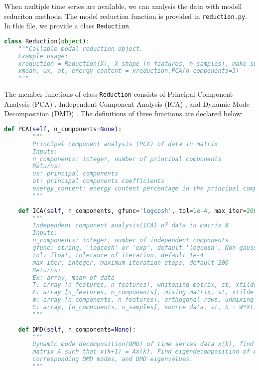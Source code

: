 
When multiple time series are available, we can analysis the data with modell reduciton methods. The model reduction function is provided in \texttt{reduction.py}. In this file, we provide a class \texttt{Reduction}.

\begin{lstlisting}[language=Python]
class Reduction(object):
    """Callable modal reduction object.
    Example usage:
    xreduction = Reduction(X), X shape [n_features, n_samples], make sure X is zero-mean
    xmean, ux, at, energy_content = xreduction.PCA(n_components=3)
    """
\end{lstlisting}

The member functions of class \texttt{Reduction} consists of Principal Component Analysis (PCA) \cite{jolliffe2002principal}, Independent Component Analysis (ICA) \cite{hyvarinen2000independent}, and Dynamic Mode Decomposition (DMD) \cite{rowley2009spectral} \cite{schmid2010dynamic}. The definitions of three functions are declared below:

\begin{lstlisting}[language=Python]
    def PCA(self, n_components=None):
        """
        Principal component analysis (PCA) of data in matrix
        Inputs:
        n_components: integer, number of principal components
        Returns:
        ux: principal components
        at: principal components coefficients
        energy_content: energy content percentage in the principal components
        """
        
    def ICA(self, n_components, gfunc='logcosh', tol=1e-4, max_iter=200):
        """
        Independent component analysis(ICA) of data in matrix X
        Inputs:
        n_components: integer, number of independent components
        gfunc: string, 'logcosh' or 'exp', default 'logcosh', Non-gaussian function
        tol: float, tolerance of iteration, default 1e-4
        max_iter: integer, maximum iteration steps, default 200
        Returns:
        Ex: array, mean of data
        T: array [n_features, n_features], whitening matrix, st, xtilde = Tx
        A: array [n_features, n_components], mixing matrix, st, xtilde = As
        W: array [n_components, n_features], orthogonal rows, unmixing matrix, st, W = inv(A), s = W*xtilde
        S: array, [n_components, n_samples], source data, st, S = W*Xtilde
        """
        
    def DMD(self, n_components=None):
        """
        Dynamic mode decomposition(DMD) of time series data x(k), find square 
        matrix A such that x(k+1) = Ax(k). Find eigendecomposition of A, and 
        corresponding DMD modes, and DMD eigenvalues.
        """
\end{lstlisting}

